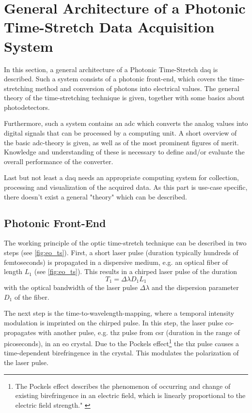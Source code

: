 \section{General Architecture of a Photonic Time-Stretch Data Acquisition System}
In this section, a general architecture of a Photonic Time-Stretch \gls{daq} is described. Such a system consists of a photonic front-end, which covers the time-stretching method and conversion of photons into electrical values. The general theory of the time-stretching technique is given, together with some basics about photodetectors. 

Furthermore, such a system contains an \gls{adc} which converts the analog values into digital signals that can be processed by a computing unit. A short overview of the basic \gls{adc}-theory is given, as well as of the most prominent figures of merit. Knowledge and understanding of these is necessary to define and/or evaluate the overall performance of the converter. 

Last but not least a \gls{daq} needs an appropriate computing system for collection, processing and visualization of the acquired data. As this part is use-case specific, there doesn't exist a general "theory" which can be described.

\subsection{Photonic Front-End}
The working principle of the optic time-stretch technique can be described in two steps (see \autoref{fig:eo_ts}).
First, a short laser pulse (duration typically hundreds of femtoseconds) is propagated in a dispersive medium, e.g. an optical fiber of length $L_1$ (see \autoref{fig:eo_ts}). 
This results in a chirped laser pulse of the duration
\begin{equation}
	T_1 = \Delta \lambda D_1 L_1
\end{equation}
with the optical bandwidth of the laser pulse $\Delta \lambda$  and the dispersion parameter $D_1$ of the fiber.

The next step is the time-to-wavelength-mapping, where a temporal intensity modulation is imprinted on the chirped pulse. In this step, the laser pulse co-propagates with another pulse, e.g. \gls{thz} pulse from \gls{csr} (duration in the range of picoseconds), in an \gls{eo} crystal. Due to the Pockels effect\footnote{The Pockels effect describes the phenomenon of occurring and change of existing birefringence in an electric field, which is linearly proportional to the electric field strength." \cite{pockels}} the \gls{thz} pulse causes a time-dependent birefringence in the crystal.
This modulates the polarization of the laser pulse.

